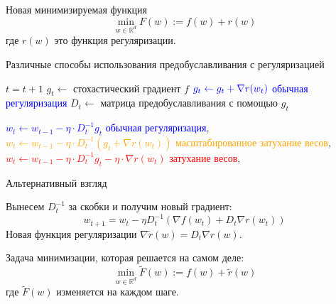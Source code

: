 \documentclass[aspectratio=169, 12pt]{beamer}
\begin{document}
\begin{frame}[shrink]{Новая минимизируемая функция}
\begin{equation*}
        \min_{w \in \mathbb{R}^d} F(w) := f(w) + r(w)
\end{equation*}
где $r(w)$ это функция регуляризации.

\begin{algorithm}[H]
    \caption{Различные способы использования предобуславливания с регуляризацией}
    \label{alg:precond}
    
    \begin{algorithmic}
            
            \State $t = t+1$
            \State $g_t \gets$ стохастический градиент $f$
            \State $\textcolor{blue}{g_t \gets g_t + \nabla r(w_t)}$ \hfill \textcolor{blue}{обычная регуляризация}
            \State $D_t \gets$ матрица предобуславливания с помощью $g_t$

            \State \textcolor{blue}{$w_t \gets w_{t-1} - \eta \cdot D_t^{-1}g_t $} \hfill \textcolor{blue}{обычная регуляризация}, 
            \State \textcolor{orange}{$w_t \gets w_{t-1} - \eta \cdot D_t^{-1} \left(g_t +\nabla r(w_t) \right)$} \hfill \textcolor{orange}{масштабированное затухание весов}, 
            \State \textcolor{red}{$w_t \gets w_{t-1} - \eta \cdot D_t^{-1} g_t  - \eta \cdot \nabla r(w_t)$} \hfill \textcolor{red}{затухание весов}, 
            \EndWhile
    \end{algorithmic}
\end{algorithm}

\end{frame}

\begin{frame}{Альтернативный взгляд}

Вынесем $D_t^{-1}$ за скобки и получим новый градиент:
\begin{equation*}
    w_{t+1} = w_t - \eta D_t^{-1}(\nabla f(w_t) + D_t \nabla r(w_t))
\end{equation*}
Новая функция регуляризации $\nabla \tilde{r}(w) = D_t \nabla r(w)$.


Задача минимизации, которая решается на самом деле:
\begin{equation*}
\label{F_tilde}
    \min_{w \in \mathbb{R}^d} \tilde{F}(w) := f(w) + \tilde{r}(w)
\end{equation*}
где $\tilde{F}(w)$ изменяется на каждом шаге.
\end{frame}
\end{document}
